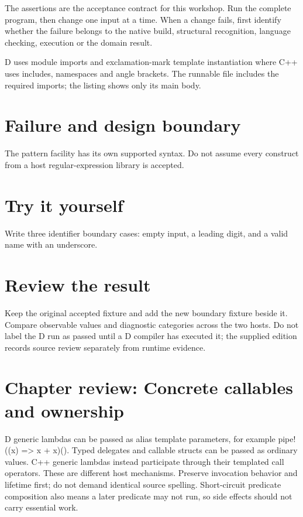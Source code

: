 The assertions are the acceptance contract for this workshop. Run the complete program, then change one input at a time. When a change fails, first identify whether the failure belongs to the native build, structural recognition, language checking, execution or the domain result.

\clearpage
{}
D uses module imports and exclamation-mark template instantiation where C++ uses includes, namespaces and angle brackets. The runnable file includes the required imports; the listing shows only its main body.


\section*{Failure and design boundary}
The pattern facility has its own supported syntax. Do not assume every construct from a host regular-expression library is accepted.

\section*{Try it yourself}
Write three identifier boundary cases: empty input, a leading digit, and a valid name with an underscore.

\section*{Review the result}
Keep the original accepted fixture and add the new boundary fixture beside it. Compare observable values and diagnostic categories across the two hosts. Do not label the D run as passed until a D compiler has executed it; the supplied edition records source review separately from runtime evidence.

\clearpage
\section*{Chapter review: Concrete callables and ownership}
D generic lambdas can be passed as alias template parameters, for example pipe!((x) => x + x)(). Typed delegates and callable structs can be passed as ordinary values. C++ generic lambdas instead participate through their templated call operators. These are different host mechanisms. Preserve invocation behavior and lifetime first; do not demand identical source spelling. Short-circuit predicate composition also means a later predicate may not run, so side effects should not carry essential work.

